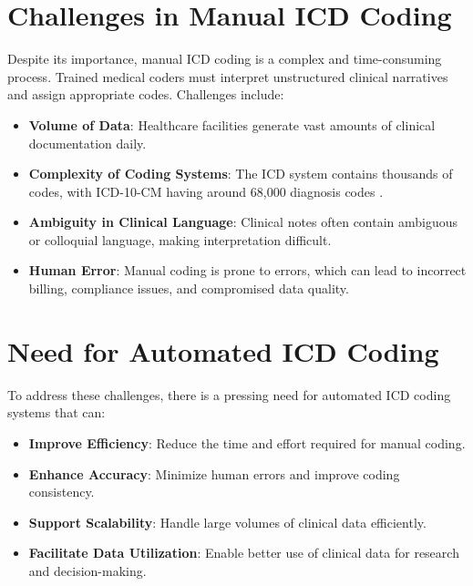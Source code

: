 \documentclass[12pt,a4paper]{report}
\begin{document}
\section{Challenges in Manual ICD Coding}
Despite its importance, manual ICD coding is a complex and time-consuming process. Trained medical coders must interpret unstructured clinical narratives and assign appropriate codes. Challenges include:
\begin{itemize}
    \item \textbf{Volume of Data}: Healthcare facilities generate vast amounts of clinical documentation daily.
    \item \textbf{Complexity of Coding Systems}: The ICD system contains thousands of codes, with ICD-10-CM having around 68,000 diagnosis codes \cite{dong2022automated}.
    \item \textbf{Ambiguity in Clinical Language}: Clinical notes often contain ambiguous or colloquial language, making interpretation difficult.
    \item \textbf{Human Error}: Manual coding is prone to errors, which can lead to incorrect billing, compliance issues, and compromised data quality.
\end{itemize}

\section{Need for Automated ICD Coding}
To address these challenges, there is a pressing need for automated ICD coding systems that can:
\begin{itemize}
    \item \textbf{Improve Efficiency}: Reduce the time and effort required for manual coding.
    \item \textbf{Enhance Accuracy}: Minimize human errors and improve coding consistency.
    \item \textbf{Support Scalability}: Handle large volumes of clinical data efficiently.
    \item \textbf{Facilitate Data Utilization}: Enable better use of clinical data for research and decision-making.
\end{itemize}
\end{document}
